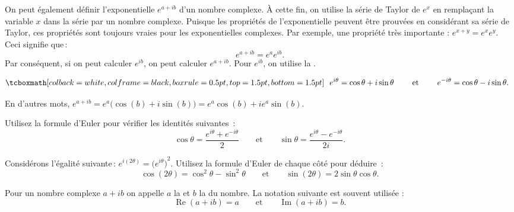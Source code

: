 \pagebreak[2]
On peut également définir l'exponentielle $e^{a+ib}$ d'un nombre complexe. À cette fin, on utilise la série de Taylor de $e^x$ en remplaçant la variable $x$ dans la série par un nombre complexe. Puisque les propriétés de l'exponentielle peuvent être prouvées en considérant sa série de Taylor, ces propriétés sont toujours vraies pour les exponentielles complexes.  Par exemple, une propriété très importante :   $e^{x+y} = e^x e^y$.  Ceci signifie que\,: 
\begin{equation*}
e^{a+ib} = e^a e^{ib}.
\end{equation*}
Par conséquent, si on peut  calculer $e^{ib}$, on peut calculer $e^{a+ib}$.  Pour $e^{ib}$, on utilise la 
\emph{}.

\begin{theorem} \label{eulersformula}
\begin{equation*}
\mybxbg{~~
e^{i \theta} = \cos \theta + i \sin \theta
\qquad \text{ et } \qquad
e^{- i \theta} = \cos \theta - i \sin \theta .
~~}
\end{equation*}
\end{theorem}

En d'autres mots, $e^{a+ib} = e^a \bigl( \cos(b) + i \sin(b) \bigr) = e^a \cos(b) + i e^a \sin(b)$.

\begin{exercise}
Utilisez la formule d'Euler pour vérifier les identités suivantes \,: 
\begin{equation*}
\cos \theta = \frac{e^{i \theta} + e^{-i \theta}}{2}
\qquad \text{et} \qquad
\sin \theta = \frac{e^{i \theta} - e^{-i \theta}}{2i}.
\end{equation*}
\end{exercise}

\begin{exercise}
Considérons l'égalité suivante\,: $e^{i(2\theta)} = {\bigl(e^{i \theta} \bigr)}^2$.  Utilisez la formule d'Euler de chaque côté pour déduire \,:
\begin{equation*}
\cos (2\theta) = \cos^2 \theta - \sin^2 \theta
\qquad \text{et} \qquad
\sin (2\theta) = 2 \sin \theta \cos \theta .
\end{equation*}
\end{exercise}

Pour un nombre complexe $a+ib$ on appelle
$a$ la \emph{} et $b$ la \emph{} du nombre.
La notation suivante est souvent utilisée : 
\begin{equation*}
\operatorname{Re}(a+ib) = a
\qquad \text{et} \qquad
\operatorname{Im}(a+ib) = b.
\end{equation*}


